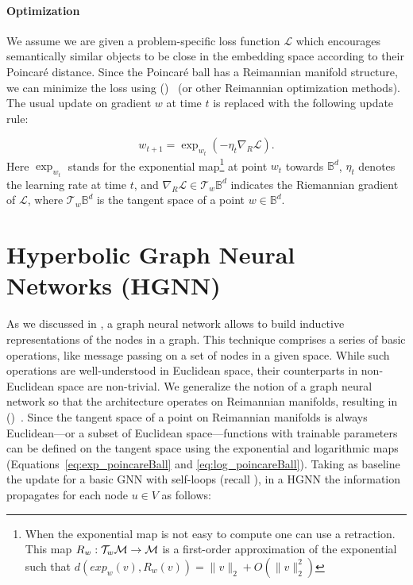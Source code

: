 \paragraph{Optimization}
We assume we are given a problem-specific loss function $\mathcal{L}$ which encourages semantically similar objects to be close in the embedding space according to their Poincaré distance. Since the Poincaré ball has a Reimannian manifold structure, we can minimize the loss using  ()~\cite{bonnabel2013RSGD} (or other Reimannian optimization methods). The usual update on gradient $w$ at time $t$ is replaced with the following update rule:

\begin{equation}
    w_{t+1} = \exp_{w_t}(-\eta_t\nabla_R\mathcal{L}).
\end{equation}
Here $\exp_{w_t}$ stands for the exponential map\footnote{When the exponential map is not easy to compute one can use a retraction. This map $R_w:\mathcal{T}_w\mathcal{M}\to\mathcal{M}$ is a first-order approximation of the exponential such that $d(exp_w(v), R_w(v))=\|v\|_2+O(\|v\|^2_2)$} at point $w_t$ towards $\mathbb{B}^d$, $\eta_t$ denotes the learning rate at time $t$, and $\nabla_R \mathcal{L} \in \mathcal{T}_{w}\mathbb{B}^d$ indicates the Riemannian gradient of $\mathcal{L}$, where $\mathcal{T}_{w}\mathbb{B}^d$ is the tangent space of a point $w \in \mathbb{B}^d$.  

\section{Hyperbolic Graph Neural Networks (HGNN)}
As we discussed in , a graph neural network allows to build inductive representations of the nodes in a graph. This technique comprises a series of basic operations, like message passing on a set of nodes in a given space. While such operations are well-understood in Euclidean space, their counterparts in non-Euclidean space are non-trivial. We generalize the notion of a graph neural network so that the architecture operates on Reimannian manifolds, resulting in  ()~\cite{liu2019HGNN}. Since the tangent space of a point on Reimannian manifolds is always Euclidean---or a subset of Euclidean space---functions with trainable parameters can be defined on the tangent space using the exponential and logarithmic maps (Equations~\ref{eq:exp_poincareBall} and \ref{eq:log_poincareBall}). Taking as baseline the update for a basic GNN with self-loops (recall ), in a HGNN the information propagates for each node $u \in V$ as follows:

